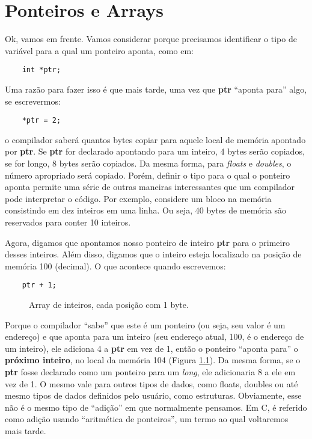 
\chapter{Ponteiros e Arrays}
Ok, vamos em frente. Vamos considerar porque precisamos identificar o tipo de variável para a qual um ponteiro aponta, como em:
\begin{lstlisting}
	int *ptr;
\end{lstlisting}

Uma razão para fazer isso é que mais tarde, uma vez que \textbf{ptr} ``aponta para'' algo, se escrevermos:
\begin{lstlisting}
	*ptr = 2;
\end{lstlisting}
o compilador saberá quantos bytes copiar para aquele local de memória apontado por \textbf{ptr}. Se \textbf{ptr} for declarado apontando para um inteiro, 4 bytes serão copiados, se for longo, 8 bytes serão copiados. Da mesma forma, para \textit{floats} e \textit{doubles}, o número apropriado será copiado. Porém, definir o tipo para o qual o ponteiro aponta permite uma série de outras maneiras interessantes que um compilador pode interpretar o código. Por exemplo, considere um bloco na memória consistindo em dez inteiros em uma linha. Ou seja, 40 bytes de memória são reservados para conter 10 inteiros.

Agora, digamos que apontamos nosso ponteiro de inteiro \textbf{ptr} para o primeiro desses inteiros. Além disso, digamos que o inteiro esteja localizado na posição de memória 100 (decimal). O que acontece quando escrevemos:
\begin{lstlisting}
	ptr + 1;
\end{lstlisting}

\begin{figure}[ht]
	\begin{center}
		
		\caption{Array de inteiros, cada posição com 1 byte.}
		\label{fig:ponteiros}
	\end{center}
\end{figure}

Porque o compilador ``sabe'' que este é um ponteiro (ou seja, seu valor é um endereço) e que aponta para um inteiro (seu endereço atual, 100, é o endereço de um inteiro), ele adiciona 4 a \textbf{ptr} em vez de 1, então o ponteiro ``aponta para'' o \textbf{próximo inteiro}, no local da memória 104 (Figura \ref{fig:ponteiros}). Da mesma forma, se o \textbf{ptr} fosse declarado como um ponteiro para um \textit{long}, ele adicionaria 8 a ele em vez de 1.
O mesmo vale para outros tipos de dados, como floats, doubles ou até mesmo tipos de dados definidos pelo usuário, como estruturas. Obviamente, esse não é o mesmo tipo de ``adição'' em que normalmente pensamos. Em C, é referido como adição usando ``aritmética de ponteiros'', um termo ao qual voltaremos mais tarde.

